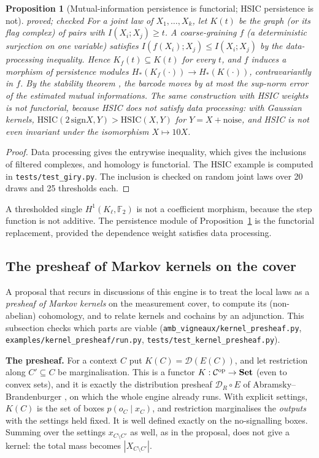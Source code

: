 \documentclass[11pt]{article}
\newtheorem{proposition}[theorem]{Proposition}
\theoremstyle{definition}
\theoremstyle{remark}
\newcommand{\st}[1]{\textsf{\small\color{gray}#1}}
\begin{document}
\begin{proposition}[Mutual-information persistence is functorial; HSIC persistence is not]\label{prop:mipers}\st{proved; checked}
For a joint law of $X_1,\dots,X_k$, let $K(t)$ be the graph (or its flag complex) of pairs with $I(X_i;X_j)\ge t$. A coarse-graining $f$ (a deterministic surjection on one variable) satisfies $I(f(X_i);X_j)\le I(X_i;X_j)$ by the data-processing inequality. Hence $K_f(t)\subseteq K(t)$ for every $t$, and $f$ induces a morphism of persistence modules $H_\ast(K_f(\cdot))\to H_\ast(K(\cdot))$, contravariantly in $f$. By the stability theorem \cite{ceh}, the barcode moves by at most the sup-norm error of the estimated mutual informations. The same construction with HSIC weights is not functorial, because HSIC does not satisfy data processing: with Gaussian kernels, $\mathrm{HSIC}(2\,\mathrm{sign}X,Y)>\mathrm{HSIC}(X,Y)$ for $Y=X+\text{noise}$, and HSIC is not even invariant under the isomorphism $X\mapsto10X$.
\end{proposition}
\begin{proof}
Data processing gives the entrywise inequality, which gives the inclusions of filtered complexes, and homology is functorial. The HSIC example is computed in \texttt{tests/test\_giry.py}. The inclusion is checked on random joint laws over 20 draws and 25 thresholds each.
\end{proof}
\noindent A thresholded single $H^1(K_\ell,\mathbb F_2)$ is not a coefficient morphism, because the step function is not additive. The persistence module of Proposition~\ref{prop:mipers} is the functorial replacement, provided the dependence weight satisfies data processing.

\subsection{The presheaf of Markov kernels on the cover}\label{sec:kernelpresheaf}
A proposal that recurs in discussions of this engine is to treat the local laws as a \emph{presheaf of Markov kernels} on the measurement cover, to compute its (non-abelian) cohomology, and to relate kernels and cochains by an adjunction. This subsection checks which parts are viable (\texttt{amb\_vigneaux/kernel\_presheaf.py}, \texttt{examples/kernel\_presheaf/run.py}, \texttt{tests/test\_kernel\_presheaf.py}).

\textbf{The presheaf.} For a context $C$ put $K(C)=\mathcal D(E(C))$, and let restriction along $C'\subseteq C$ be marginalisation. This is a functor $K:\mathcal C^{\rm op}\to\mathbf{Set}$ (even to convex sets), and it is exactly the distribution presheaf $\mathcal D_R\circ E$ of Abramsky--Brandenburger \cite{ab11}, on which the whole engine already runs. With explicit settings, $K(C)$ is the set of boxes $p(o_C\mid x_C)$, and restriction marginalises the \emph{outputs} with the settings held fixed. It is well defined exactly on the no-signalling boxes. Summing over the settings $x_{C\setminus C'}$ as well, as in the proposal, does not give a kernel: the total mass becomes $|X_{C\setminus C'}|$.
\end{document}
